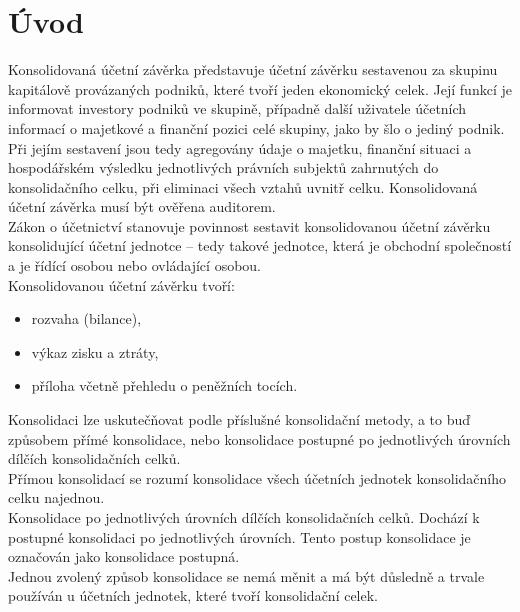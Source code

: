 \documentclass[12pt]{article}
\title{\Title}
\author{\Author}
\date{}
\begin{document}
\maketitle
\thispagestyle{empty}

\section{Úvod}
Konsolidovaná účetní závěrka představuje účetní závěrku sestavenou za skupinu kapitálově 
provázaných podniků, které tvoří jeden ekonomický celek. Její funkcí je informovat investory 
podniků ve skupině, případně další uživatele účetních informací o majetkové a finanční pozici 
celé skupiny, jako by šlo o jediný podnik. Při jejím sestavení jsou tedy agregovány údaje 
o majetku, finanční situaci a hospodářském výsledku jednotlivých právních subjektů 
zahrnutých do konsolidačního celku, při eliminaci všech vztahů uvnitř celku.  Konsolidovaná účetní závěrka musí být ověřena auditorem.
\\

Zákon o účetnictví stanovuje povinnost sestavit konsolidovanou účetní závěrku konsolidující účetní jednotce – tedy takové jednotce, která je obchodní společností a je řídící osobou nebo ovládající osobou.
\\
Konsolidovanou účetní závěrku tvoří: 
\begin{itemize}
\item rozvaha (bilance), 
\item výkaz zisku a ztráty, 
\item příloha včetně přehledu o peněžních tocích. 
\end{itemize}
Konsolidaci lze uskutečňovat podle příslušné konsolidační metody, a to buď způsobem přímé konsolidace, nebo konsolidace postupné po jednotlivých úrovních dílčích konsolidačních celků. 
\\

Přímou konsolidací se rozumí konsolidace všech účetních jednotek konsolidačního 
celku najednou.
\\

Konsolidace po jednotlivých úrovních dílčích konsolidačních celků. Dochází k postupné konsolidaci po jednotlivých úrovních. Tento postup konsolidace je označován jako konsolidace postupná. 
\\

Jednou zvolený způsob konsolidace se nemá měnit a má být důsledně a trvale používán u účetních jednotek, které tvoří konsolidační celek. 
\end{document}
